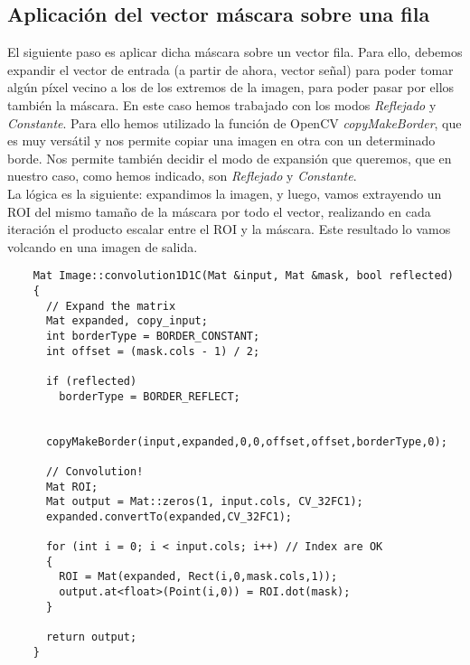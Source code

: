\documentclass[a4paper, 11pt]{article}
\theoremstyle{definition}
\begin{document}
  \subsection{Aplicación del vector máscara sobre una fila}

  El siguiente paso es aplicar dicha máscara sobre un vector fila. Para ello, debemos
  expandir el vector de entrada (a partir de ahora, vector señal) para poder tomar
  algún píxel vecino a los de los extremos de la imagen, para poder pasar por ellos también
  la máscara. En este caso hemos trabajado con los modos \textit{Reflejado} y \textit{Constante}.
  Para ello hemos utilizado la función de OpenCV \textit{copyMakeBorder}, que es
  muy versátil y nos permite copiar una imagen en otra con un determinado borde.
  Nos permite también decidir el modo de expansión que queremos, que en nuestro caso,
  como hemos indicado, son \textit{Reflejado} y \textit{Constante}.\\

  La lógica es la siguiente: expandimos la imagen, y luego, vamos extrayendo
  un ROI del mismo tamaño de la máscara por todo el vector, realizando en cada
  iteración el producto escalar entre el ROI y la máscara. Este resultado lo vamos
  volcando en una imagen de salida.

  \begin{lstlisting}
    Mat Image::convolution1D1C(Mat &input, Mat &mask, bool reflected)
    {
      // Expand the matrix
      Mat expanded, copy_input;
      int borderType = BORDER_CONSTANT;
      int offset = (mask.cols - 1) / 2;

      if (reflected)
        borderType = BORDER_REFLECT;


      copyMakeBorder(input,expanded,0,0,offset,offset,borderType,0);

      // Convolution!
      Mat ROI;
      Mat output = Mat::zeros(1, input.cols, CV_32FC1);
      expanded.convertTo(expanded,CV_32FC1);

      for (int i = 0; i < input.cols; i++) // Index are OK
      {
        ROI = Mat(expanded, Rect(i,0,mask.cols,1));
        output.at<float>(Point(i,0)) = ROI.dot(mask);
      }

      return output;
    }
  \end{lstlisting}
\end{document}
